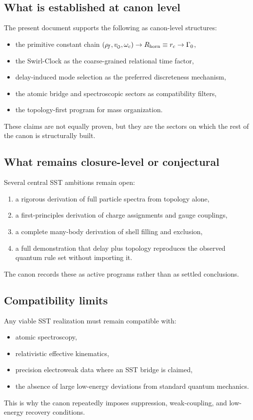 \documentclass[11pt]{article}
\theoremstyle{definition}
\theoremstyle{plain}
\theoremstyle{remark}
\newcommand{\swirlarrow}{\mathchoice{\mkern-2mu\scriptstyle\boldsymbol{\circlearrowleft}}{\mkern-2mu\scriptstyle\boldsymbol{\circlearrowleft}}{\mkern-2mu\scriptscriptstyle\boldsymbol{\circlearrowleft}}{\mkern-2mu\scriptscriptstyle\boldsymbol{\circlearrowleft}}}
\newcommand{\rhoF}{{\rho_{\!f}}}
\begin{document}
    \subsection{What is established at canon level}
        The present document supports the following as canon-level structures:
        \begin{itemize}
            \item the primitive constant chain $(\rhoF, v_{\swirlarrow}, \omega_c) \to R_{\mathrm{horn}}\equiv r_c \to \Gamma_0$,
            \item the Swirl-Clock as the coarse-grained relational time factor,
            \item delay-induced mode selection as the preferred discreteness mechanism,
            \item the atomic bridge and spectroscopic sectors as compatibility filters,
            \item the topology-first program for mass organization.
        \end{itemize}
        These claims are not equally proven, but they are the sectors on which the rest of the canon is structurally built.

    \subsection{What remains closure-level or conjectural}
        Several central SST ambitions remain open:
        \begin{enumerate}
            \item a rigorous derivation of full particle spectra from topology alone,
            \item a first-principles derivation of charge assignments and gauge couplings,
            \item a complete many-body derivation of shell filling and exclusion,
            \item a full demonstration that delay plus topology reproduces the observed quantum rule set without importing it.
        \end{enumerate}
        The canon records these as active programs rather than as settled conclusions.

    \subsection{Compatibility limits}
        Any viable SST realization must remain compatible with:
        \begin{itemize}
            \item atomic spectroscopy,
            \item relativistic effective kinematics,
            \item precision electroweak data where an SST bridge is claimed,
            \item the absence of large low-energy deviations from standard quantum mechanics.
        \end{itemize}
        This is why the canon repeatedly imposes suppression, weak-coupling, and low-energy recovery conditions.
\end{document}
